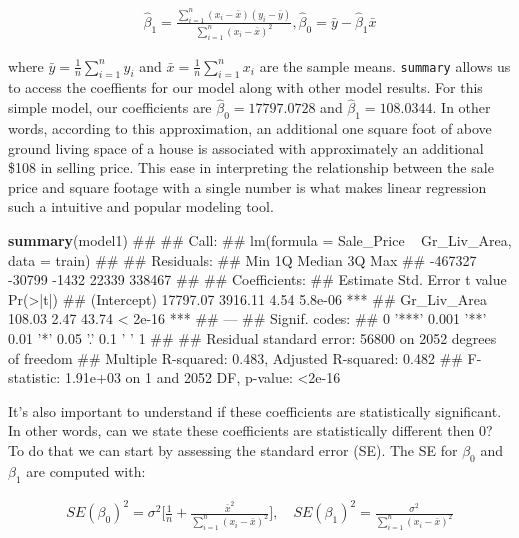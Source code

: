 \documentclass[]{book}
\newenvironment{Shaded}{\begin{snugshade}}{\end{snugshade}}
\newcommand{\KeywordTok}[1]{\textcolor[rgb]{0.13,0.29,0.53}{\textbf{#1}}}
\newcommand{\NormalTok}[1]{#1}
\theoremstyle{definition}
\theoremstyle{definition}
\theoremstyle{definition}
\theoremstyle{remark}
\begin{document}
\begin{align}
\label{eq:coefficients}
  \hat \beta_1 = \frac{\sum^n_{i=1}(x_i - \bar x)(y_i - \bar y)}{\sum^n_{i=1}(x_i - \bar x)^2},
  \hat \beta_0 = \bar y - \hat \beta_1 \bar x
\end{align}

where \(\bar y = \frac{1}{n}\sum^n_{i=1}y_i\) and
\(\bar x = \frac{1}{n}\sum^n_{i=1}x_i\) are the sample means.
\texttt{summary} allows us to access the coeffients for our model along
with other model results. For this simple model, our coefficients are
\(\hat \beta_0 = 17797.0728\) and \(\hat \beta_1 = 108.0344\). In other
words, according to this approximation, an additional one square foot of
above ground living space of a house is associated with approximately an
additional \$108 in selling price. This ease in interpreting the
relationship between the sale price and square footage with a single
number is what makes linear regression such a intuitive and popular
modeling tool.

\begin{Shaded}
\begin{Highlighting}[]
\KeywordTok{summary}\NormalTok{(model1)}
\NormalTok{## }
\NormalTok{## Call:}
\NormalTok{## lm(formula = Sale_Price ~ Gr_Liv_Area, data = train)}
\NormalTok{## }
\NormalTok{## Residuals:}
\NormalTok{##     Min      1Q  Median      3Q     Max }
\NormalTok{## -467327  -30799   -1432   22339  338467 }
\NormalTok{## }
\NormalTok{## Coefficients:}
\NormalTok{##             Estimate Std. Error t value Pr(>|t|)    }
\NormalTok{## (Intercept) 17797.07    3916.11    4.54  5.8e-06 ***}
\NormalTok{## Gr_Liv_Area   108.03       2.47   43.74  < 2e-16 ***}
\NormalTok{## ---}
\NormalTok{## Signif. codes:  }
\NormalTok{## 0 '***' 0.001 '**' 0.01 '*' 0.05 '.' 0.1 ' ' 1}
\NormalTok{## }
\NormalTok{## Residual standard error: 56800 on 2052 degrees of freedom}
\NormalTok{## Multiple R-squared:  0.483,  Adjusted R-squared:  0.482 }
\NormalTok{## F-statistic: 1.91e+03 on 1 and 2052 DF,  p-value: <2e-16}
\end{Highlighting}
\end{Shaded}

It's also important to understand if these coefficients are
statistically significant. In other words, can we state these
coefficients are statistically different then 0? To do that we can start
by assessing the standard error (SE). The SE for \(\beta_0\) and
\(\beta_1\) are computed with:

\begin{align}
\label{eq:coef-se}
SE(\beta_0)^2 = \sigma^2\bigg[\frac{1}{n}+\frac{\bar{x}^2}{\sum^n_{i=1}(x_i - \bar{x})^2} \bigg],
\quad SE(\beta_1)^2 = \frac{\sigma^2}{\sum^n_{i=1}(x_i - \bar{x})^2}
\end{align}
\end{document}
